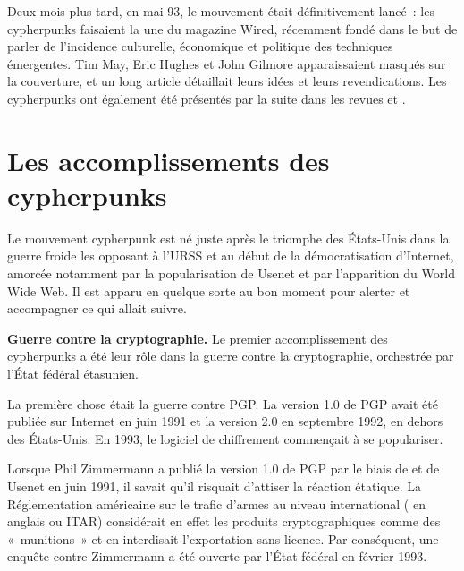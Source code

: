 Deux mois plus tard, en mai 93, le mouvement était définitivement lancé~: les cypherpunks faisaient la une du magazine Wired, récemment fondé dans le but de parler de l'incidence culturelle, économique et politique des techniques émergentes. Tim May, Eric Hughes et John Gilmore apparaissaient masqués sur la couverture, et un long article détaillait leurs idées et leurs revendications. Les cypherpunks ont également été présentés par la suite dans les revues  et .

\section*{Les accomplissements des cypherpunks}

Le mouvement cypherpunk est né juste après le triomphe des États-Unis dans la guerre froide les opposant à l'URSS et au début de la démocratisation d'Internet, amorcée notamment par la popularisation de Usenet et par l'apparition du World Wide Web. Il est apparu en quelque sorte au bon moment pour alerter et accompagner ce qui allait suivre.


\textbf{Guerre contre la cryptographie.} Le premier accomplissement des cypherpunks a été leur rôle dans la guerre contre la cryptographie, orchestrée par l'État fédéral étasunien.

La première chose était la guerre contre PGP. La version 1.0 de PGP avait été publiée sur Internet en juin 1991 et la version 2.0 en septembre 1992, en dehors des États-Unis. En 1993, le logiciel de chiffrement commençait à se populariser.

Lorsque Phil Zimmermann a publié la version 1.0 de PGP par le biais de  et de Usenet en juin 1991, il savait qu'il risquait d'attiser la réaction étatique. La Réglementation américaine sur le trafic d'armes au niveau international ( en anglais ou ITAR) considérait en effet les produits cryptographiques comme des «~munitions~» et en interdisait l'exportation sans licence. Par conséquent, une enquête contre Zimmermann a été ouverte par l'État fédéral en février 1993.

